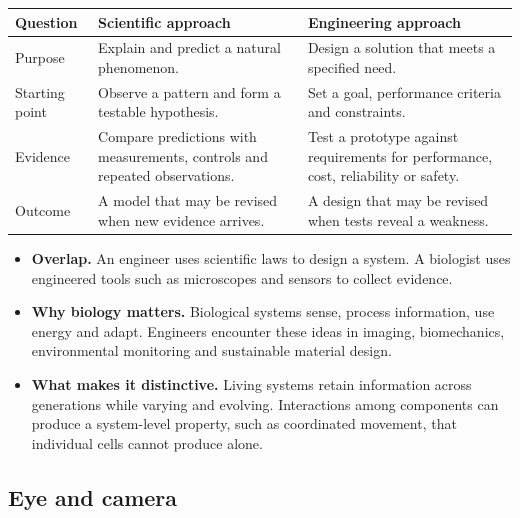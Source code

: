 \documentclass[12pt,a4paper]{article}
\begin{document}
\par\vspace{5pt}
\begingroup
\setlength{\extrarowheight}{1pt}
\noindent\begin{tabularx}{\linewidth}{|B{3cm}|Y|Y|}
\hline
\textbf{Question} & \textbf{Scientific approach} & \textbf{Engineering approach} \\ \hline
Purpose & Explain and predict a natural phenomenon. & Design a solution that meets a specified need. \\ \hline
Starting point & Observe a pattern and form a testable hypothesis. & Set a goal, performance criteria and constraints. \\ \hline
Evidence & Compare predictions with measurements, controls and repeated observations. & Test a prototype against requirements for performance, cost, reliability or safety. \\ \hline
Outcome & A model that may be revised when new evidence arrives. & A design that may be revised when tests reveal a weakness. \\ \hline
\end{tabularx}\par
\endgroup
\begin{itemize}[leftmargin=*, itemsep=3pt, topsep=4pt]
  \item \textbf{Overlap.} An engineer uses scientific laws to design a system. A biologist uses engineered tools such as microscopes and sensors to collect evidence.
  \item \textbf{Why biology matters.} Biological systems sense, process information, use energy and adapt. Engineers encounter these ideas in imaging, biomechanics, environmental monitoring and sustainable material design.
  \item \textbf{What makes it distinctive.} Living systems retain information across generations while varying and evolving. Interactions among components can produce a system-level property, such as coordinated movement, that individual cells cannot produce alone.
\end{itemize}
\subsection{Eye and camera}
\begin{tcolorbox}[tikzbox, title={Two imaging chains}]
\centering
{}\par
\end{tcolorbox}
\end{document}
